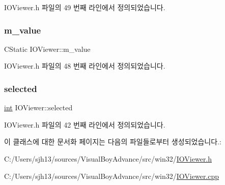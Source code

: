 I\+O\+Viewer.\+h 파일의 49 번째 라인에서 정의되었습니다.

\mbox{\label{class_i_o_viewer_aeb772ac65eb0a1c472473b2436b83728}} 
\subsubsection{\texorpdfstring{m\+\_\+value}{m\_value}}
{\footnotesize\ttfamily C\+Static I\+O\+Viewer\+::m\+\_\+value}



I\+O\+Viewer.\+h 파일의 48 번째 라인에서 정의되었습니다.

\mbox{\label{class_i_o_viewer_a418dd29c924f6fa180e995ba9db8399c}} 
\subsubsection{\texorpdfstring{selected}{selected}}
{\footnotesize\ttfamily \mbox{\hyperlink{_util_8cpp_a0ef32aa8672df19503a49fab2d0c8071}{int}} I\+O\+Viewer\+::selected}



I\+O\+Viewer.\+h 파일의 42 번째 라인에서 정의되었습니다.



이 클래스에 대한 문서화 페이지는 다음의 파일들로부터 생성되었습니다.\+:\begin{DoxyCompactItemize}
\item 
C\+:/\+Users/sjh13/sources/\+Visual\+Boy\+Advance/src/win32/\mbox{\hyperlink{_i_o_viewer_8h}{I\+O\+Viewer.\+h}}\item 
C\+:/\+Users/sjh13/sources/\+Visual\+Boy\+Advance/src/win32/\mbox{\hyperlink{_i_o_viewer_8cpp}{I\+O\+Viewer.\+cpp}}\end{DoxyCompactItemize}
